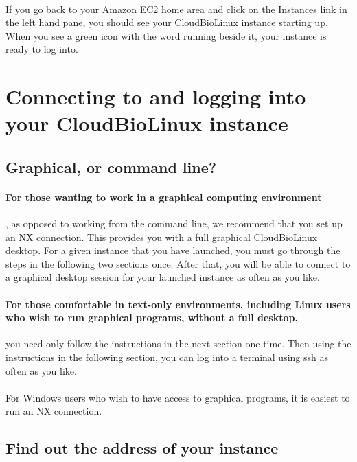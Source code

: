 \paragraph{}If you go back to your \href{http://console.aws.amazon.com/ec2/home}{Amazon EC2 home area} and click on the Instances link in the left hand pane, you should see your CloudBioLinux instance starting up. When you see a green icon with the word running beside it, your instance is ready to log into.

\section{Connecting to and logging into your CloudBioLinux instance}

\subsection{Graphical, or command line?}

\paragraph{For those wanting to work in a graphical computing environment}, as opposed to working from the command line, we recommend that you set up an NX connection. This provides you with a full graphical CloudBioLinux desktop. For a given instance that you have launched, you must go through the steps in the following two sections once. After that, you will be able to connect to a graphical desktop session for your launched instance as often as you like.

\paragraph{For those comfortable in text-only environments, including Linux users who wish to run graphical programs, without a full desktop,} you need only follow the instructions in the next section one time. Then using the instructions in the following section, you can log into a terminal using ssh as often as you like. 

\paragraph{}For Windows users who wish to have access to graphical programs, it is easiest to run an NX connection.  

\subsection{Find out the address of your instance}

